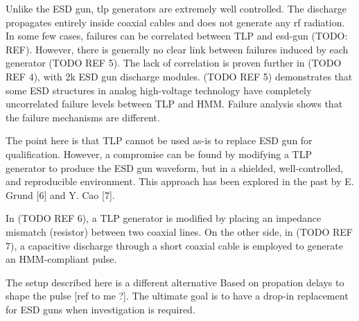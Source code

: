 Unlike the ESD gun, \gls{tlp} generators are extremely well controlled.
The discharge propagates entirely inside coaxial cables and does not generate any \gls{rf} radiation.
In some few cases, failures can be correlated between \gls{TLP} and \gls{esd-gun} (TODO: REF).
However, there is generally no clear link between failures induced by each generator (TODO REF 5).
The lack of correlation is proven further in (TODO REF 4), with 2k\textOmega{} ESD gun discharge modules.
(TODO REF 5) demonstrates that some ESD structures in analog high-voltage technology have completely uncorrelated failure levels between TLP and HMM. Failure analysis shows that the failure mechanisms are different.

The point here is that \gls{TLP} cannot be used as-is to replace ESD gun for qualification.
However, a compromise can be found by modifying a TLP generator to produce the ESD gun waveform, but in a shielded, well-controlled, and reproducible environment.
This approach has been explored in the past by E. Grund [6] and Y. Cao [7].

In (TODO REF 6), a TLP generator is modified by placing an impedance mismatch (resistor) between two coaxial lines.
On the other side, in (TODO REF 7), a capacitive discharge through a short coaxial cable is employed to generate an HMM-compliant pulse.



The setup described here is a different alternative
Based on propation delays to shape the pulse [ref to me ?].
The ultimate goal is to have a drop-in replacement for ESD guns when investigation is required.

